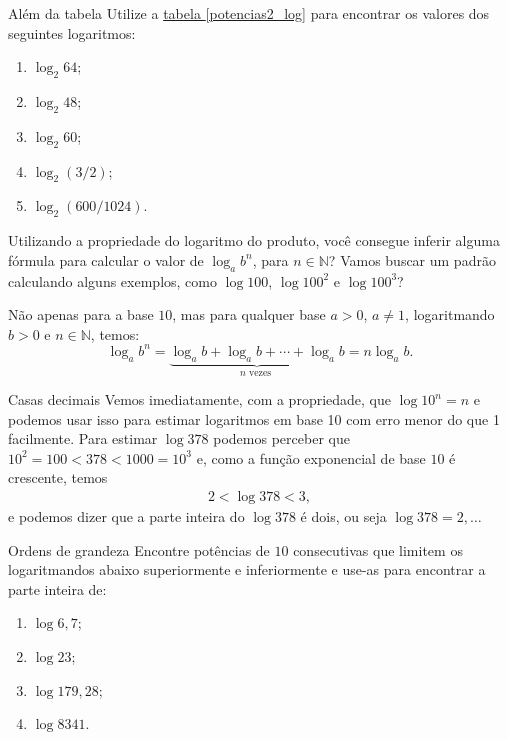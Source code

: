 \begin{task}{Além da tabela}
Utilize a \hyperref[potencias2_log]{tabela \ref{potencias2_log}} para encontrar os valores dos seguintes logaritmos:
\begin{enumerate}
\item $\log_2 64$;
\item $\log_2 48$;
\item $\log_2 60$;
\item $\log_2 (3/2)$;
\item $\log_2 (600/1024)$.
\end{enumerate}
\end{task}


\begin{reflection}
Utilizando a propriedade do logaritmo do produto, você consegue inferir alguma fórmula para calcular o valor de $\log_a b^n$, para $n \in \mathbb{N}$? Vamos buscar um padrão calculando alguns exemplos, como $\log 100$, $\log 100^2$ e $\log 100^3$?
\end{reflection}

\begin{observation}{}
Não apenas para a base $10$, mas para qualquer base $a>0$, $a \neq 1$, logaritmando $b>0$ e $n \in \mathbb{N}$, temos:
$$
\log_a b^n = \underbrace{\log_a b + \log_a b + \cdots + \log_a b}_{n \mbox{ vezes }} = n\log_a b.
$$
\end{observation}


\begin{example}{Casas decimais}
Vemos imediatamente, com a propriedade, que $\log 10^n =n$ e podemos usar isso para estimar logaritmos em base 10 com erro menor do que 1 facilmente. Para estimar $\log 378$ podemos perceber que $10^2=100<378<1000=10^3$ e, como a função exponencial de base $10$ é crescente, temos
\begin{align*}
2 < \log 378 < 3,
\end{align*}
e podemos dizer que a parte inteira do $\log 378$ é dois, ou seja $\log 378 = 2{,}\ldots$
\end{example}

\begin{task}{Ordens de grandeza}
Encontre potências de $10$ consecutivas que limitem os logaritmandos abaixo superiormente e inferiormente e use-as para encontrar a parte inteira de:
\begin{enumerate}
\item $\log 6{,}7$;
\item $\log 23$;
\item $\log 179{,}28$;
\item $\log 8341$.
\end{enumerate}
\end{task}


